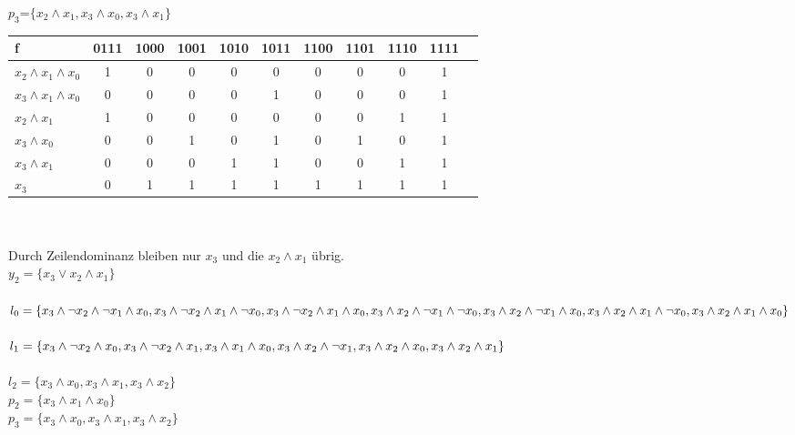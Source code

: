 \documentclass[11pt,a4paper]{article}
\begin{document}
$p_3$=$\lbrace x_2 \wedge x_1, x_3 \wedge x_0, x_3 \wedge x_1 \rbrace$\\
\begin{tabular}{l | c | c | c | c | c | c | c | c | c | c }
f&0111&1000&1001&1010&1011&1100&1101&1110&1111 \\ \hline
$x_2 \wedge x_1 \wedge x_0$&1&0&0&0&0&0&0&0&1\\
$x_3 \wedge x_1 \wedge x_0$&0&0&0&0&1&0&0&0&1\\
$x_2 \wedge x_1$&1&0&0&0&0&0&0&1&1\\
$x_3 \wedge x_0$&0&0&1&0&1&0&1&0&1\\
$x_3 \wedge x_1$&0&0&0&1&1&0&0&1&1\\
$x_3$&0&1&1&1&1&1&1&1&1\\
\end{tabular}\\ \\
Durch Zeilendominanz bleiben nur $x_3$ und die $x_2 \wedge x_1$ übrig.\\
$y_2= \lbrace x_3 \vee x_2 \wedge x_1 \rbrace$\\ \\
$l_0= \lbrace
x_3 \wedge \neg x_2 \wedge \neg x_1 \wedge x_0,\\
x_3 \wedge \neg x_2 \wedge x_1 \wedge \neg x_0, \\
x_3 \wedge \neg x_2 \wedge x_1 \wedge x_0, \\
x_3 \wedge x_2 \wedge \neg x_1 \wedge \neg x_0,\\
x_3 \wedge x_2 \wedge \neg x_1 \wedge x_0,\\
x_3 \wedge x_2 \wedge x_1 \wedge \neg x_0, \\
x_3 \wedge x_2 \wedge x_1 \wedge x_0 \rbrace$\\ \\
$l_1= \lbrace 
x_3 \wedge \neg x_2 \wedge x_0,\\
x_3 \wedge \neg x_2 \wedge x_1,\\
x_3 \wedge x_1 \wedge x_0,\\
x_3 \wedge x_2 \wedge \neg x_1,\\
x_3 \wedge x_2 \wedge x_0,\\
x_3 \wedge x_2 \wedge x_1 \rbrace$\\ \\
$l_2= \lbrace 
x_3 \wedge x_0,
x_3 \wedge x_1,
x_3 \wedge x_2 \rbrace$\\ 
$p_2= \lbrace x_3 \wedge x_1 \wedge x_0 \rbrace$\\
$p_3= \lbrace 
x_3 \wedge x_0,
x_3 \wedge x_1,
x_3 \wedge x_2 \rbrace$\\
\end{document}
